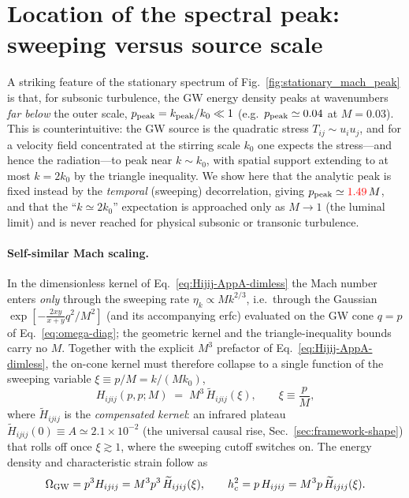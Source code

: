 \documentclass[10pt,prd,aps,nobibnotes,superscriptaddress,preprintnumbers,notitlepage]{revtex4-1}
\newcommand{\add}[1]{{\color{red}#1}}
\newcommand{\add}[1]{#1}
\begin{document}
\section{Location of the spectral peak: sweeping versus source scale}
\label{sec:peak-location}

A striking feature of the stationary spectrum of
Fig.~\ref{fig:stationary_mach_peak} is that, for subsonic turbulence, the GW
energy density peaks at wavenumbers \emph{far below} the outer scale,
$p_{\rm peak}=k_{\rm peak}/k_0\ll1$ (e.g.\ $p_{\rm peak}\simeq0.04$ at $M=0.03$).
This is counterintuitive: the GW source is the quadratic stress
$T_{ij}\sim u_i u_j$, and for a velocity field concentrated at the stirring scale
$k_0$ one expects the stress---and hence the radiation---to peak near $k\sim k_0$,
with spatial support extending to at most $k=2k_0$ by the triangle inequality. We
show here that the analytic peak is fixed instead by the \emph{temporal}
(sweeping) decorrelation, giving $p_{\rm peak}\simeq\add{1.49}\,M$, and that the
``$k\simeq2k_0$'' expectation is approached only as $M\to1$ (the luminal limit)
and is never reached for physical subsonic or transonic turbulence.

\paragraph{Self-similar Mach scaling.}
In the dimensionless kernel of Eq.~\eqref{eq:Hijij-AppA-dimless} the Mach number
enters \emph{only} through the sweeping rate $\eta_k\propto M k^{2/3}$, i.e.\
through the Gaussian $\exp[-\tfrac{2xy}{x+y}q^2/M^2]$ (and its accompanying erfc)
evaluated on the GW cone $q=p$ of Eq.~\eqref{eq:omega-diag}; the geometric kernel
and the triangle-inequality bounds carry no $M$. Together with the explicit $M^3$
prefactor of Eq.~\eqref{eq:Hijij-AppA-dimless}, the on-cone kernel must therefore
collapse to a single function of the sweeping variable $\xi\equiv p/M=k/(Mk_0)$,
\begin{equation}
  H_{ijij}(p,p;M)\;=\;M^{3}\,\widetilde H_{ijij}(\xi),\qquad \xi\equiv\frac{p}{M},
  \label{eq:peak-ansatz}
\end{equation}
where $\widetilde H_{ijij}$ is the \emph{compensated kernel}: an infrared plateau
$\widetilde H_{ijij}(0)\equiv A\simeq2.1\times10^{-2}$ (the universal causal rise,
Sec.~\ref{sec:framework-shape}) that rolls off once $\xi\gtrsim1$, where the
sweeping cutoff switches on. The energy density and characteristic strain follow as
\begin{equation}
  \Omega_{\rm GW}=p^3H_{ijij}=M^{3}p^{3}\,\widetilde H_{ijij}(\xi),
  \qquad
  h_c^{2}=p\,H_{ijij}=M^{3}p\,\widetilde H_{ijij}(\xi).
  \label{eq:peak-OmegaHc}
\end{equation}
\end{document}
